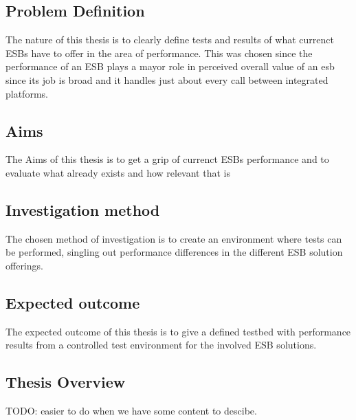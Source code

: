 \documentclass{llncs}
\begin{document}
\subsection{Problem Definition}
The nature of this thesis is to clearly define tests and results of what currenct ESBs have to offer in the area of performance. This was chosen since the performance of an ESB plays a mayor role in perceived overall value of an esb since its job is broad and it handles just about every call between integrated platforms.

\subsection{Aims}
The Aims of this thesis is to get a grip of currenct ESBs performance and to evaluate what already exists and how relevant that is

\subsection{Investigation method}
The chosen method of investigation is to create an environment where tests can be performed, singling out performance differences in the different ESB solution offerings.

\subsection{Expected outcome}
The expected outcome of this thesis is to give a defined testbed with performance results from a controlled test environment for the involved ESB solutions.


\subsection{Thesis Overview}
TODO: easier to do when we have some content to descibe.
\end{document}
